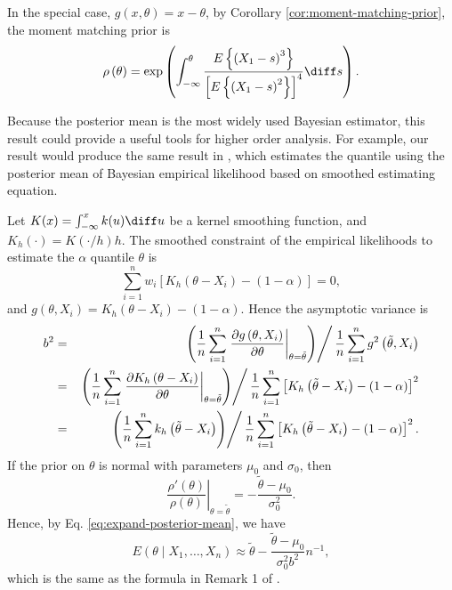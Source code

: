 In {the} special case,  $g\left(x,\theta\right)=x-\theta$, {by} Corollary \ref{cor:moment-matching-prior}, the moment matching prior is 
\[
	\rho\left(\theta\right)=\exp\left(\int_{-\infty}^{\theta}\frac{E\left\{\left(X_1-s\right)^3\right\}}{\left[E\left\{\left(X_1-s\right)^2\right\}\right]^4}\diff s\right).
\]

 \begin{remark}
 Because the posterior mean is the most widely used Bayesian estimator,
 this result could provide a useful tools for higher order analysis.
 For example, our result would produce the same result in \citep{vexler2014computing},
 which estimates the quantile using the posterior mean of Bayesian empirical likelihood based on smoothed estimating equation. 
 
 
Let $K(x)=\int_{-\infty}^x k(u)\diff u $ be a kernel smoothing function, 
and $K_h(\cdot)=K(\cdot/h)h $.
The smoothed constraint of the empirical likelihoods to estimate the $\alpha$ quantile $\theta $ is 
\[
	\sum_{i=1}^n w_i \left [ K_h \left( \theta -X_i \right) -(1-\alpha )\right]=0,
\]
and $g\left(\theta,X_i\right)=K_h \left( \theta -X_i \right) -(1-\alpha )$. 
Hence the asymptotic variance is 
\begin{eqnarray*}
b^2&=& \left. \left( \frac{1}{n} \sum_{i=1}^n \left. \frac{\partial g\left(\theta,X_i\right)}{\partial \theta} \right |_{\theta=\tilde{\theta}}\right) \right/ \frac{1}{n}\sum_{i=1}^n g^2\left(\tilde{\theta},X_i\right) \\
& =& \left. \left( \frac{1}{n} \sum_{i=1}^n \left. \frac{\partial K_h \left( \theta -X_i \right)}{\partial \theta} \right |_{\theta=\tilde{\theta}}\right) \right/ \frac{1}{n}\sum_{i=1}^n \left[ K_h \left( \tilde{\theta} -X_i \right) -(1-\alpha )\right]^2 \\
&=& \left. \left( \frac{1}{n} \sum_{i=1}^n k_h \left(\tilde{\theta}-X_i\right)\right) \right/ \frac{1}{n}\sum_{i=1}^n \left[ K_h \left( \tilde{\theta} -X_i \right) -(1-\alpha )\right]^2. 
\end{eqnarray*}
If the prior on $\theta$ is normal with parameters $\mu_0$ and $\sigma_0$, then 
\[
  \left. \frac{\rho'(\theta)}{\rho(\theta)} \right|_{\theta=\tilde{\theta}} =
  -\frac{\tilde{\theta}-\mu_0}{\sigma_0^2}.
\]
Hence, by Eq. \ref{eq:expand-posterior-mean}, we have 
\[
	E\left( \theta \mid X_1,\ldots,X_n \right) \approx \tilde{\theta} 
	-\frac{\tilde{\theta}-\mu_0}{\sigma_0^2 b^2} n^{-1},
\]
which is the same as the formula in Remark 1 of \cite{vexler2014computing}. 
 \end{remark}
 
